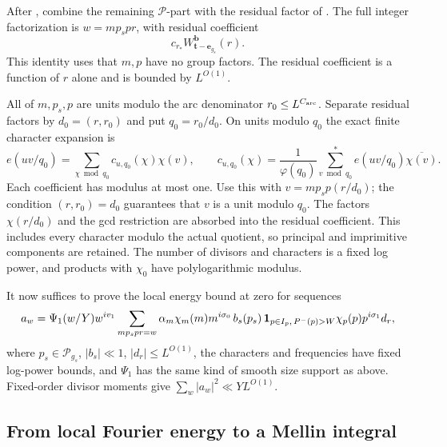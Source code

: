 After , combine the remaining
$\mathcal P$-part with the residual factor of
. The full integer factorization is
$w=mp_sp r$, with residual coefficient
\[
 c_{r_*}W_{\mathbf t-\mathbf e_{g_s}}^{\mathbf b}(r).
\]
This identity uses that $m,p$ have no group factors. The residual
coefficient is a function of $r$ alone and is bounded by $L^{O(1)}$.

All of $m,p_s,p$ are units modulo the arc denominator $r_0\leq
L^{C_{\rm arc}}$. Separate residual factors by
$d_0=(r,r_0)$ and put $q_0=r_0/d_0$. On units modulo $q_0$ the exact
finite character expansion is
\[
 e(uv/q_0)=\sum_{\chi\bmod q_0}c_{u,q_0}(\chi)\chi(v),
 \qquad
 c_{u,q_0}(\chi)=\frac1{\varphi(q_0)}
           \sum_{v\bmod q_0}^{*}e(uv/q_0)\overline{\chi(v)}.
\]
Each coefficient has modulus at most one. Use this with
$v=mp_sp(r/d_0)$; the condition $(r,r_0)=d_0$ guarantees that $v$
is a unit modulo $q_0$. The factors $\chi(r/d_0)$ and the gcd
restriction are absorbed into the residual coefficient. This
includes every character modulo the actual quotient, so principal
and imprimitive components are retained. The number of divisors and
characters is a fixed log power, and products with $\chi_0$ have
polylogarithmic modulus.

It now suffices to prove the local energy bound at zero for sequences
\begin{equation}\label{eq:four-factor-endpoint}
 a_w=\Psi_1(w/Y)w^{iv_1}
       \sum_{mp_sp r=w}
       \alpha_m\chi_m(m)m^{i\sigma_0}\,
       b_s(p_s)\,
       \mathbf 1_{p\in I_p,\,P^{-}(p)>W}\chi_p(p)p^{i\sigma_1}d_r,
\end{equation}
where $p_s\in\mathcal P_{g_s}$, $|b_s|\ll1$, $|d_r|\leq L^{O(1)}$,
the characters and frequencies have fixed log-power bounds, and
$\Psi_1$ has the same kind of smooth size support as above.
Fixed-order divisor moments give $\sum_w|a_w|^2\ll YL^{O(1)}$.

\subsection{From local Fourier energy to a Mellin integral}

